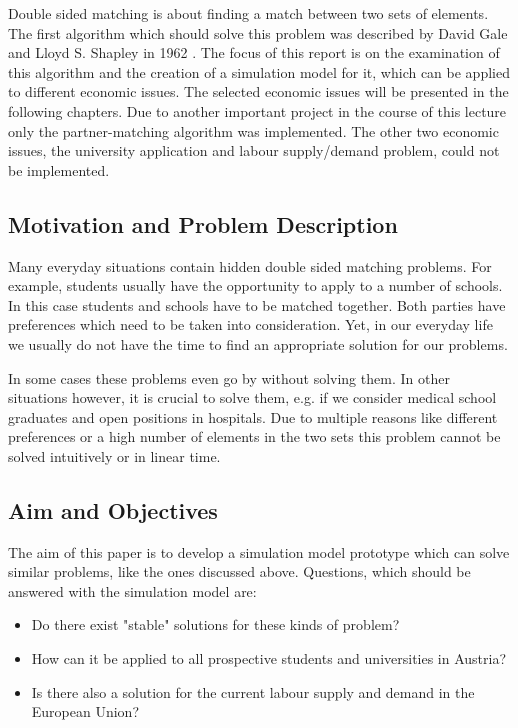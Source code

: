 \label{introduction}
Double sided matching is about finding a match between two sets of elements.
The first algorithm which should solve this problem was described by David Gale and Lloyd S. Shapley in 1962 \cite{gale62a}. 
The focus of this report is on the examination of this algorithm and the creation of a simulation model for it, which can be applied to different economic issues.
The selected economic issues will be presented in the following chapters. 
Due to another important project in the course of this lecture only the partner-matching algorithm was implemented.
The other two economic issues, the university application and labour supply/demand problem, could not be implemented.

\subsection{Motivation and Problem Description}
Many everyday situations contain hidden double sided matching problems. 
For example, students usually have the opportunity to apply to a number of schools. 
In this case students and schools have to be matched together. 
Both parties have preferences which need to be taken into consideration. 
Yet, in our everyday life we usually do not have the time to find an appropriate solution for our problems. 

In some cases these problems even go by without solving them. 
In other situations however, it is crucial to solve them, e.g. if we consider medical school graduates and open positions in hospitals. 
Due to multiple reasons like different preferences or a high number of elements in the two sets this problem cannot be solved intuitively or in linear time.

\subsection{Aim and Objectives}
The aim of this paper is to develop a simulation model prototype which can solve similar problems, like the ones discussed above.
Questions, which should be answered with the simulation model are:
\begin{itemize}
	\item Do there exist "stable" solutions for these kinds of problem?
	\item How can it be applied to all prospective students and universities in Austria?
	\item Is there also a solution for the current labour supply and demand in the European Union?
\end{itemize}

